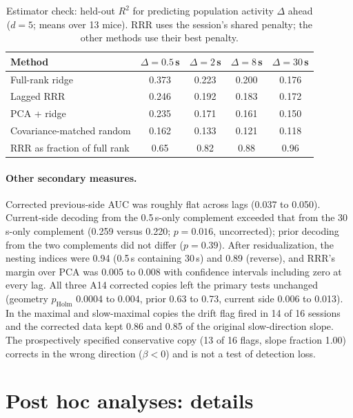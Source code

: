 \documentclass{article}
\newcommand{\holm}{p_{\mathrm{Holm}}}
\begin{document}
\begin{table}[H]
  \caption{Estimator check: held-out $R^2$ for predicting population activity $\Delta$ ahead ($d=5$; means over
  13 mice). RRR uses the session's shared penalty; the other methods use their best penalty.}
  \label{tab:estimator}
  \centering\small
  \begin{tabular}{lcccc}
    \toprule
    Method & $\Delta=0.5$\,s & $\Delta=2$\,s & $\Delta=8$\,s & $\Delta=30$\,s \\
    \midrule
    Full-rank ridge                 & 0.373 & 0.223 & 0.200 & 0.176 \\
    Lagged RRR                      & 0.246 & 0.192 & 0.183 & 0.172 \\
    PCA + ridge                     & 0.235 & 0.171 & 0.161 & 0.150 \\
    Covariance-matched random       & 0.162 & 0.133 & 0.121 & 0.118 \\
    \midrule
    RRR as fraction of full rank    & 0.65  & 0.82  & 0.88  & 0.96  \\
    \bottomrule
  \end{tabular}
\end{table}

\paragraph{Other secondary measures.} Corrected previous-side AUC was roughly flat across lags (0.037 to 0.050).
Current-side decoding from the 0.5\,s-only complement exceeded that from the 30\,s-only complement (0.259 versus 0.220;
$p=0.016$, uncorrected); prior decoding from the two complements did not differ ($p=0.39$). After residualization, the
nesting indices were 0.94 (0.5\,s containing 30\,s) and 0.89 (reverse), and RRR's margin over PCA was 0.005 to 0.008
with confidence intervals including zero at every lag. All three A14 corrected copies left the primary tests unchanged (geometry $\holm$ 0.0004 to 0.004, prior 0.63 to
0.73, current side 0.006 to 0.013). In the maximal and slow-maximal copies the drift flag fired in 14 of 16 sessions
and the corrected data kept 0.86 and 0.85 of the original slow-direction slope. The prospectively specified conservative copy
(13 of 16 flags, slope fraction 1.00) corrects in the wrong direction ($\beta<0$) and is not a test of detection
loss.

\section{Post hoc analyses: details}
\label{app:sim}
\end{document}
